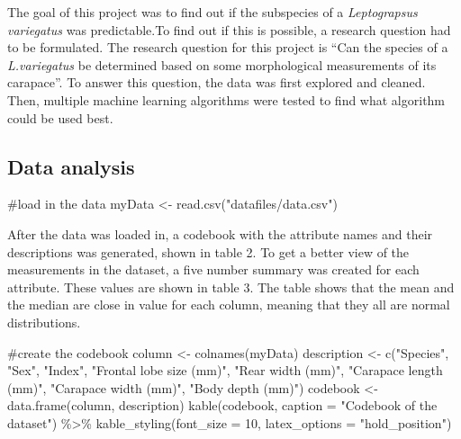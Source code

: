 \documentclass[
]{article}
\newenvironment{Shaded}{}{}
\newcommand{\AttributeTok}[1]{#1}
\newcommand{\CommentTok}[1]{\textcolor[rgb]{0.00,0.50,0.00}{#1}}
\newcommand{\DecValTok}[1]{#1}
\newcommand{\FunctionTok}[1]{#1}
\newcommand{\NormalTok}[1]{#1}
\newcommand{\OtherTok}[1]{\textcolor[rgb]{1.00,0.25,0.00}{#1}}
\newcommand{\SpecialCharTok}[1]{\textcolor[rgb]{0.00,0.50,0.50}{#1}}
\newcommand{\StringTok}[1]{\textcolor[rgb]{0.00,0.50,0.50}{#1}}
\begin{document}
The goal of this project was to find out if the subspecies of a
\emph{Leptograpsus variegatus} was predictable.To find out if this is
possible, a research question had to be formulated. The research
question for this project is ``Can the species of a \emph{L.variegatus}
be determined based on some morphological measurements of its
carapace''. To answer this question, the data was first explored and
cleaned. Then, multiple machine learning algorithms were tested to find
what algorithm could be used best.

\newpage

\hypertarget{data-analysis}{%
\subsection{Data analysis}\label{data-analysis}}

\begin{Shaded}
\begin{Highlighting}[]
\CommentTok{\#load in the data}
\NormalTok{myData }\OtherTok{\textless{}{-}} \FunctionTok{read.csv}\NormalTok{(}\StringTok{"datafiles/data.csv"}\NormalTok{)}
\end{Highlighting}
\end{Shaded}

After the data was loaded in, a codebook with the attribute names and
their descriptions was generated, shown in table 2. To get a better view
of the measurements in the dataset, a five number summary was created
for each attribute. These values are shown in table 3. The table shows
that the mean and the median are close in value for each column, meaning
that they all are normal distributions.

\begin{Shaded}
\begin{Highlighting}[]
\CommentTok{\#create the codebook}
\NormalTok{column }\OtherTok{\textless{}{-}} \FunctionTok{colnames}\NormalTok{(myData)}
\NormalTok{description }\OtherTok{\textless{}{-}} \FunctionTok{c}\NormalTok{(}\StringTok{"Species"}\NormalTok{, }\StringTok{"Sex"}\NormalTok{, }\StringTok{"Index"}\NormalTok{, }\StringTok{"Frontal lobe size (mm)"}\NormalTok{, }\StringTok{"Rear width (mm)"}\NormalTok{, }\StringTok{"Carapace length (mm)"}\NormalTok{, }\StringTok{"Carapace width (mm)"}\NormalTok{, }\StringTok{"Body depth (mm)"}\NormalTok{)}
\NormalTok{codebook }\OtherTok{\textless{}{-}} \FunctionTok{data.frame}\NormalTok{(column, description)}
\FunctionTok{kable}\NormalTok{(codebook, }\AttributeTok{caption =} \StringTok{"Codebook of the dataset"}\NormalTok{) }\SpecialCharTok{\%\textgreater{}\%} 
\FunctionTok{kable\_styling}\NormalTok{(}\AttributeTok{font\_size =} \DecValTok{10}\NormalTok{, }\AttributeTok{latex\_options =} \StringTok{"hold\_position"}\NormalTok{)}
\end{Highlighting}
\end{Shaded}
\end{document}
